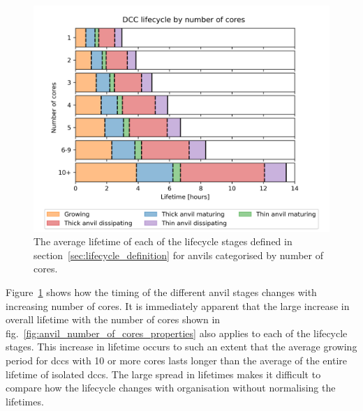 \begin{figure}[tp]
    \centering
    \includegraphics[width=\textwidth]{figures/chapter3_11.png}
    \caption[
    The average lifetime of each lifecycle stage for anvils categorised by number of cores
    ]{
    The average lifetime of each of the lifecycle stages defined in section~\ref{sec:lifecycle_definition} for anvils categorised by number of cores.
    }
    \label{fig:anvil_number_of_cores_absolute_lifecycle}
\end{figure}

Figure~\ref{fig:anvil_number_of_cores_absolute_lifecycle} shows how the timing of the different anvil stages changes with increasing number of cores.
It is immediately apparent that the large increase in overall lifetime with the number of cores shown in fig.~\ref{fig:anvil_number_of_cores_properties} also applies to each of the lifecycle stages.
This increase in lifetime occurs to such an extent that the average growing period for \acrshort{dcc}s with 10 or more cores lasts longer than the average of the entire lifetime of isolated \acrshort{dcc}s.
The large spread in lifetimes makes it difficult to compare how the lifecycle changes with organisation without normalising the lifetimes.

